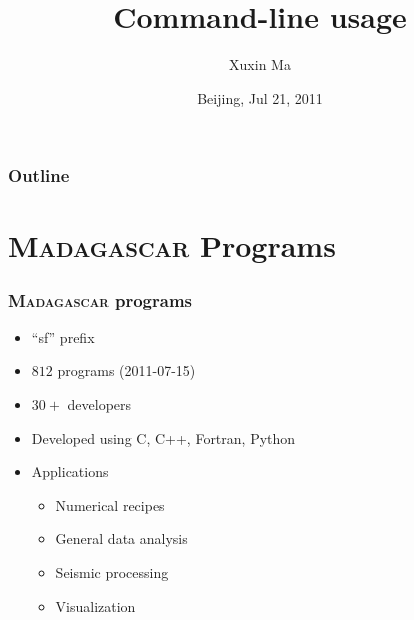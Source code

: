 \title[command line]{Command-line usage}
\author[Xuxin]{Xuxin Ma}
\date[Madagascar School 2011]{Beijing, Jul 21, 2011}

\begin{frame}
  \titlepage
\end{frame}

  

\begin{frame}
  \frametitle{Outline}
  \tableofcontents
\end{frame}

\section{\textsc{Madagascar}  Programs}

\begin{frame}
  \frametitle{\textsc{Madagascar} programs}
  
  \begin{itemize}
  \item ``sf'' prefix
  \item $812$ programs (2011-07-15)
  \item $30+$ developers
  \item Developed using C, C++, Fortran, Python
  \item Applications
    \begin{itemize}
    \item Numerical recipes
    \item General data analysis
    \item Seismic processing
    \item Visualization
    \end{itemize}
  \end{itemize}
\end{frame}

